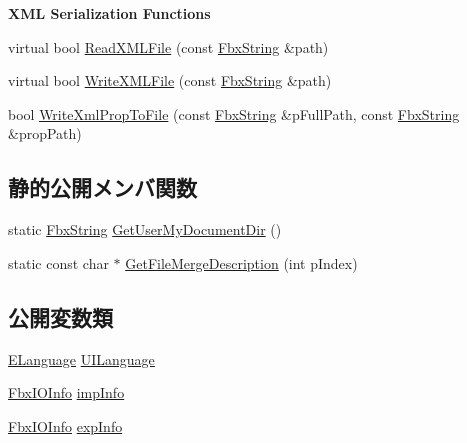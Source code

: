 \begin{Indent}\textbf{ X\+ML Serialization Functions}\par
\begin{DoxyCompactItemize}
\item 
virtual bool \hyperlink{class_fbx_i_o_settings_a83350a45f6370913ca1b2c0527a07d8b}{Read\+X\+M\+L\+File} (const \hyperlink{class_fbx_string}{Fbx\+String} \&path)
\item 
virtual bool \hyperlink{class_fbx_i_o_settings_a5b8c0000832b00d77e469cfb1b8f4c81}{Write\+X\+M\+L\+File} (const \hyperlink{class_fbx_string}{Fbx\+String} \&path)
\item 
bool \hyperlink{class_fbx_i_o_settings_abd6cac9a8962bee693960397190a9771}{Write\+Xml\+Prop\+To\+File} (const \hyperlink{class_fbx_string}{Fbx\+String} \&p\+Full\+Path, const \hyperlink{class_fbx_string}{Fbx\+String} \&prop\+Path)
\end{DoxyCompactItemize}
\end{Indent}
\subsection*{静的公開メンバ関数}
\begin{DoxyCompactItemize}
\item 
static \hyperlink{class_fbx_string}{Fbx\+String} \hyperlink{class_fbx_i_o_settings_a6ddfd3af6a5f6974d4bd3cd6b5315fd6}{Get\+User\+My\+Document\+Dir} ()
\item 
static const char $\ast$ \hyperlink{class_fbx_i_o_settings_ac44253178e75301e554ee8350274247c}{Get\+File\+Merge\+Description} (int p\+Index)
\end{DoxyCompactItemize}
\subsection*{公開変数類}
\begin{DoxyCompactItemize}
\item 
\hyperlink{class_fbx_i_o_settings_a84f2effd8e41c382faa5ca58046f323f}{E\+Language} \hyperlink{class_fbx_i_o_settings_a66b062ff1bbcedce5978358a81ec9026}{U\+I\+Language}
\item 
\hyperlink{class_fbx_i_o_info}{Fbx\+I\+O\+Info} \hyperlink{class_fbx_i_o_settings_aa966915ec88f2963202d309e43b12e34}{imp\+Info}
\item 
\hyperlink{class_fbx_i_o_info}{Fbx\+I\+O\+Info} \hyperlink{class_fbx_i_o_settings_a138a9e01c4f15719b15710a0d9393623}{exp\+Info}
\end{DoxyCompactItemize}
